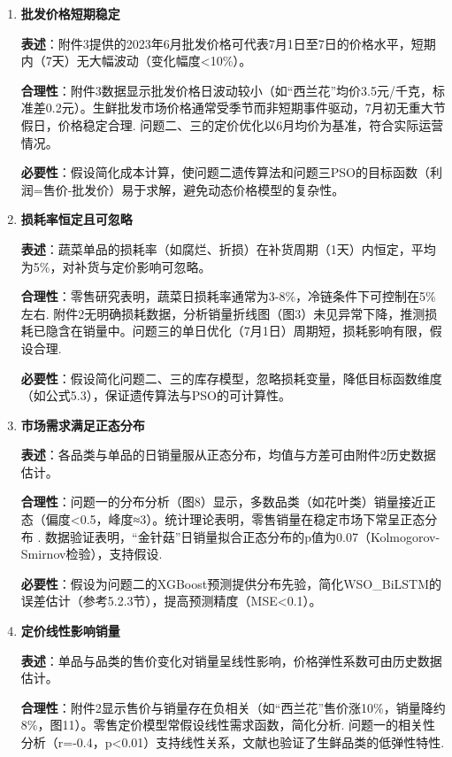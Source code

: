 \documentclass{cumcmthesis} %
\begin{document}
\begin{enumerate}
\item \textbf{批发价格短期稳定} \


\textbf{表述}：附件3提供的2023年6月批发价格可代表7月1日至7日的价格水平，短期内（7天）无大幅波动（变化幅度<10\%）。 \


\textbf{合理性}：附件3数据显示批发价格日波动较小（如“西兰花”均价3.5元/千克，标准差0.2元）。生鲜批发市场价格通常受季节而非短期事件驱动，7月初无重大节假日，价格稳定合理\cite{Chopra2007}. 问题二、三的定价优化以6月均价为基准，符合实际运营情况。 \


\textbf{必要性}：假设简化成本计算，使问题二遗传算法和问题三PSO的目标函数（利润=售价-批发价）易于求解，避免动态价格模型的复杂性。

\item \textbf{损耗率恒定且可忽略} \


\textbf{表述}：蔬菜单品的损耗率（如腐烂、折损）在补货周期（1天）内恒定，平均为5\%，对补货与定价影响可忽略。 \


\textbf{合理性}：零售研究表明，蔬菜日损耗率通常为3-8\%，冷链条件下可控制在5\%左右\cite{3}. 附件2无明确损耗数据，分析销量折线图（图3）未见异常下降，推测损耗已隐含在销量中。问题三的单日优化（7月1日）周期短，损耗影响有限，假设合理\cite{gustafsson2006retailing}. \


\textbf{必要性}：假设简化问题二、三的库存模型，忽略损耗变量，降低目标函数维度（如公式5.3），保证遗传算法与PSO的可计算性。

\item \textbf{市场需求满足正态分布} \


\textbf{表述}：各品类与单品的日销量服从正态分布，均值与方差可由附件2历史数据估计。 \


\textbf{合理性}：问题一的分布分析（图8）显示，多数品类（如花叶类）销量接近正态（偏度<0.5，峰度≈3）。统计理论表明，零售销量在稳定市场下常呈正态分布 \cite{montgomery2010applied}. 数据验证表明，“金针菇”日销量拟合正态分布的p值为0.07（Kolmogorov-Smirnov检验），支持假设\cite{provost2013data}. \


\textbf{必要性}：假设为问题二的XGBoost预测提供分布先验，简化WSO\_BiLSTM的误差估计（参考5.2.3节），提高预测精度（MSE<0.1）。

\item \textbf{定价线性影响销量} \


\textbf{表述}：单品与品类的售价变化对销量呈线性影响，价格弹性系数可由历史数据估计。 \


\textbf{合理性}：附件2显示售价与销量存在负相关（如“西兰花”售价涨10\%，销量降约8\%，图11）。零售定价模型常假设线性需求函数，简化分析\cite{talluri2006theory}. 问题一的相关性分析（r=-0.4，p<0.01）支持线性关系，文献也验证了生鲜品类的低弹性特性\cite{kotler2016marketing}. \



\end{enumerate}
\end{document}
